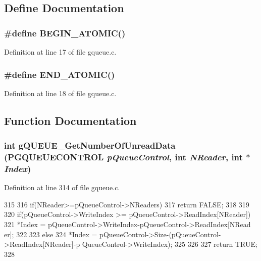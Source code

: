 \subsection{Define Documentation}
\subsubsection[{BEGIN\_\-ATOMIC}]{\setlength{\rightskip}{0pt plus 5cm}\#define BEGIN\_\-ATOMIC()}\label{gqueue_8c_a4dbeb573edcedfa8f803e1891730e526}


Definition at line 17 of file gqueue.c.
\subsubsection[{END\_\-ATOMIC}]{\setlength{\rightskip}{0pt plus 5cm}\#define END\_\-ATOMIC()}\label{gqueue_8c_a8980cf83b4c1f4b1d693d1c9d2a54535}


Definition at line 18 of file gqueue.c.

\subsection{Function Documentation}
\subsubsection[{gQUEUE\_\-GetNumberOfUnreadData}]{\setlength{\rightskip}{0pt plus 5cm}int gQUEUE\_\-GetNumberOfUnreadData ({\bf PGQUEUECONTROL} {\em pQueueControl}, \/  int {\em NReader}, \/  int $\ast$ {\em Index})}\label{gqueue_8c_a7138af0e73adef329c891210ba747a2e}


Definition at line 314 of file gqueue.c.


\begin{DoxyCode}
315 {
316         if(NReader>=pQueueControl->NReaders){
317                 return FALSE;
318         }
319 
320         if(pQueueControl->WriteIndex >= pQueueControl->ReadIndex[NReader]){
321                 *Index = pQueueControl->WriteIndex-pQueueControl->ReadIndex[NRead
      er];
322         }
323         else{
324                 *Index = pQueueControl->Size-(pQueueControl->ReadIndex[NReader]-p
      QueueControl->WriteIndex);
325         }
326         
327         return TRUE;
328 }                      
\end{DoxyCode}

